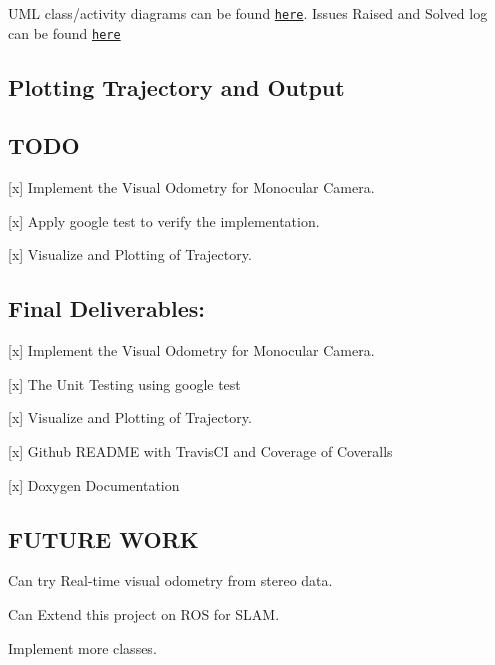 U\+ML class/activity diagrams can be found \href{https://github.com/bhargavipatel/808X_VO/tree/master/UML}{\tt here}. Issues Raised and Solved log can be found \href{https://github.com/bhargavipatel/808X_VO/issues}{\tt here}

\subsection*{Plotting Trajectory and Output}

 

\subsection*{T\+O\+DO}


\begin{DoxyItemize}
\item \mbox{[}x\mbox{]} Implement the Visual Odometry for Monocular Camera.
\item \mbox{[}x\mbox{]} Apply google test to verify the implementation.
\item \mbox{[}x\mbox{]} Visualize and Plotting of Trajectory. \subsection*{Final Deliverables\+:}
\end{DoxyItemize}


\begin{DoxyItemize}
\item \mbox{[}x\mbox{]} Implement the Visual Odometry for Monocular Camera.
\item \mbox{[}x\mbox{]} The Unit Testing using google test
\item \mbox{[}x\mbox{]} Visualize and Plotting of Trajectory.
\item \mbox{[}x\mbox{]} Github R\+E\+A\+D\+ME with Travis\+CI and Coverage of Coveralls
\item \mbox{[}x\mbox{]} Doxygen Documentation
\end{DoxyItemize}

\subsection*{F\+U\+T\+U\+RE W\+O\+RK}


\begin{DoxyItemize}
\item Can try Real-\/time visual odometry from stereo data.
\item Can Extend this project on R\+OS for S\+L\+AM.
\item Implement more classes.
\end{DoxyItemize}

